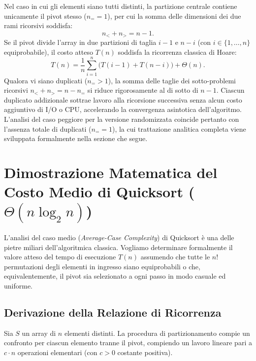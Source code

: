 Nel caso in cui gli elementi siano tutti distinti, la partizione centrale contiene unicamente il pivot stesso ($n_= = 1$), per cui la somma delle dimensioni dei due rami ricorsivi soddisfa:
\begin{equation}
  n_< + n_> = n - 1.
\end{equation}
Se il pivot divide l'array in due partizioni di taglia $i - 1$ e $n - i$ (con $i \in \{1, \dots, n\}$ equiprobabile), il costo atteso $T(n)$ soddisfa la ricorrenza classica di Hoare:
\begin{equation}
  T(n) = \frac{1}{n} \sum_{i=1}^{n} \Big( T(i - 1) + T(n - i) \Big) + \Theta(n).
\end{equation}
Qualora vi siano duplicati ($n_= > 1$), la somma delle taglie dei sotto-problemi ricorsivi $n_< + n_> = n - n_=$ si riduce rigorosamente al di sotto di $n - 1$. Ciascun duplicato addizionale sottrae lavoro alla ricorsione successiva senza alcun costo aggiuntivo di I/O o CPU, accelerando la convergenza asintotica dell'algoritmo. L'analisi del caso peggiore per la versione randomizzata coincide pertanto con l'assenza totale di duplicati ($n_= = 1$), la cui trattazione analitica completa viene sviluppata formalmente nella sezione che segue.

\FloatBarrier
\section[Costo Medio di Quicksort (\texorpdfstring{$\Theta(n \log_2 n)$}{Theta(n log n)})]{Dimostrazione Matematica del Costo Medio di Quicksort (\texorpdfstring{$\Theta(n \log_2 n)$}{Theta(n log n)})}
\label{sec:quicksort-average-case-proof}

L'analisi del caso medio (\textit{Average-Case Complexity}) di Quicksort è una delle pietre miliari dell'algoritmica classica. Vogliamo determinare formalmente il valore atteso del tempo di esecuzione $T(n)$ assumendo che tutte le $n!$ permutazioni degli elementi in ingresso siano equiprobabili o che, equivalentemente, il pivot sia selezionato a ogni passo in modo casuale ed uniforme.
\FloatBarrier

\subsection{Derivazione della Relazione di Ricorrenza}
\label{subsec:quicksort-recurrence-derivation}

Sia $S$ un array di $n$ elementi distinti. La procedura di partizionamento compie un confronto per ciascun elemento tranne il pivot, compiendo un lavoro lineare pari a $c \cdot n$ operazioni elementari (con $c > 0$ costante positiva).

